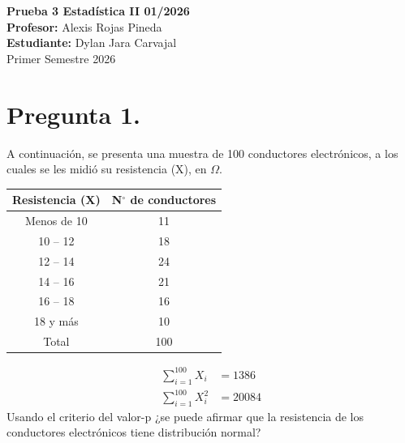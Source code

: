 \documentclass[12pt,a4paper]{article}
\begin{document}
    \begin{center}
        \vspace{1cm}
        \LARGE\textbf{Prueba 3 Estadística II 01/2026} \\
        \Large{\textbf{Profesor:} Alexis Rojas Pineda} \\
        \Large{\textbf{Estudiante:} Dylan Jara Carvajal} \\
        \Large{Primer Semestre 2026}
    \end{center}



\section*{Pregunta 1.}
A continuación, se presenta una muestra de 100 conductores electrónicos, a los cuales se les midió su resistencia (X), en $\Omega$.

\begin{center}
    \begin{tabular}{cc}
        \toprule
        Resistencia (X) & N$^\circ$ de conductores \\
        \midrule
        Menos de 10 & 11 \\
        10 -- 12 & 18 \\
        12 -- 14 & 24 \\
        14 -- 16 & 21 \\
        16 -- 18 & 16 \\
        18 y más & 10 \\
        \midrule
        Total & 100 \\
        \bottomrule
    \end{tabular}
\end{center}

\begin{align*}
    \sum_{i=1}^{100}X_{i} &= 1386 \\
    \sum_{i=1}^{100}X_{i}^{2} &= 20084
\end{align*}
Usando el criterio del valor-p ¿se puede afirmar que la resistencia de los conductores electrónicos tiene distribución normal?
\end{document}
